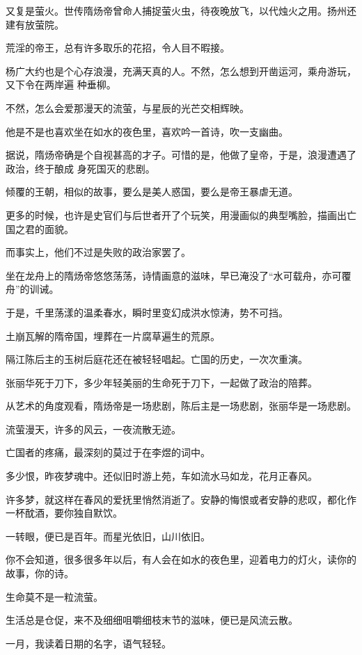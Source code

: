 \documentclass[12pt,a4paper]{article}
\begin{document}
		又复是萤火。世传隋炀帝曾命人捕捉萤火虫，待夜晚放飞，以代烛火之用。扬州还建有放萤院。

		荒淫的帝王，总有许多取乐的花招，令人目不暇接。

		杨广大约也是个心存浪漫，充满天真的人。不然，怎么想到开凿运河，乘舟游玩，又下令在两岸遍
	种垂柳。

		不然，怎么会爱那漫天的流萤，与星辰的光芒交相辉映。\par
		他是不是也喜欢坐在如水的夜色里，喜欢吟一首诗，吹一支幽曲。

		据说，隋炀帝确是个自视甚高的才子。可惜的是，他做了皇帝，于是，浪漫遭遇了政治，终于酿成
	身死国灭的悲剧。

		倾覆的王朝，相似的故事，要么是美人惑国，要么是帝王暴虐无道。\par
		更多的时候，也许是史官们与后世者开了个玩笑，用漫画似的典型嘴脸，描画出亡国之君的面貌。\par
		而事实上，他们不过是失败的政治家罢了。

		坐在龙舟上的隋炀帝悠悠荡荡，诗情画意的滋味，早已淹没了“水可载舟，亦可覆舟”的训诫。\par
		于是，千里荡漾的温柔春水，瞬时里变幻成洪水惊涛，势不可挡。\par
		土崩瓦解的隋帝国，埋葬在一片腐草遍生的荒原。\par
		隔江陈后主的玉树后庭花还在被轻轻唱起。亡国的历史，一次次重演。\par
		张丽华死于刀下，多少年轻美丽的生命死于刀下，一起做了政治的陪葬。\par
		从艺术的角度观看，隋炀帝是一场悲剧，陈后主是一场悲剧，张丽华是一场悲剧。

		流萤漫天，许多的风云，一夜流散无迹。\par
		亡国者的疼痛，最深刻的莫过于在李煜的词中。\par
		多少恨，昨夜梦魂中。还似旧时游上苑，车如流水马如龙，花月正春风。\par
		许多梦，就这样在春风的爱抚里悄然消逝了。安静的悔恨或者安静的悲叹，都化作一杯酖酒，要你独自默饮。\par
		一转眼，便已是百年。而星光依旧，山川依旧。\par
		你不会知道，很多很多年以后，有人会在如水的夜色里，迎着电力的灯火，读你的故事，你的诗。\par
		生命莫不是一粒流萤。

	\endwriting



		生活总是仓促，来不及细细咀嚼细枝末节的滋味，便已是风流云散。\par
		一月，我读着日期的名字，语气轻轻。
\end{document}
